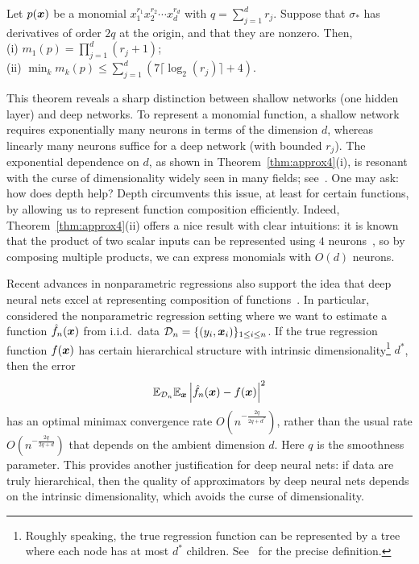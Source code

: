 \begin{thm}\label{thm:approx4}
Let $p(\text{\boldmath $x$})$ be a monomial $x_1^{r_1} x_2^{r_2} \cdots x_d^{r_d}$ with $q = \sum_{j=1}^d r_j$. Suppose that $\sigma_*$ has derivatives of order $2q$ at the origin, and that they are nonzero. Then,\\
(i) $m_1(p) = \prod_{j=1}^d (r_j + 1)$; \\
(ii) $\min_k m_k(p) \le \sum_{j=1}^d \left( 7 \lceil \log_2(r_j) \rceil + 4  \right)$.
\end{thm}

This theorem reveals a sharp distinction between shallow networks (one hidden layer) and deep networks. To represent a monomial function, a shallow network requires exponentially many neurons in terms of the dimension $d$, whereas linearly many neurons suffice for a deep network (with bounded $r_j$). The exponential dependence on $d$, as shown in Theorem~\ref{thm:approx4}(i), is resonant with the curse of dimensionality widely seen in many fields; see~\cite{donoho2000high}. One may ask: how does depth help? Depth circumvents this issue, at least for certain functions, by allowing us to represent function composition efficiently. Indeed, Theorem~\ref{thm:approx4}(ii) offers a nice result with clear intuitions: it is known that the product of two scalar inputs can be represented using $4$ neurons~\citep{lin2017does}, so by composing multiple products, we can express monomials with $O(d)$ neurons.

Recent advances in nonparametric regressions also support the idea that deep neural nets excel at representing composition of functions~\citep{bauer2017deep, schmidt2017nonparametric}. In particular,~\cite{bauer2017deep} considered the nonparametric regression setting where we want to estimate a function $\hat f_n(\text{\boldmath $x$})$ from i.i.d.~data $\mathcal{D}_n = \{ (y_i, \text{\boldmath $x$}_i) \}_{1\leq i\leq n}$. If the true regression function $f(\text{\boldmath $x$})$ has certain hierarchical structure with intrinsic dimensionality\footnote{Roughly speaking, the true regression function can be represented by a tree where each node has at most $d^*$ children. See~\cite{bauer2017deep} for the precise definition.} $d^*$, then the error
\begin{equation*}
\mathbb{E}_{\mathcal{D}_n} \mathbb{E}_{\text{\boldmath $x$}} \left| \hat f_n(\text{\boldmath $x$}) - f(\text{\boldmath $x$}) \right|^2
\end{equation*}
has an optimal minimax convergence rate $O(n^{-\frac{2q}{2q+d^*}})$, rather than the usual rate $O(n^{-\frac{2q}{2q+d}})$ that depends on the ambient dimension $d$. Here $q$ is the smoothness parameter. This provides another justification for deep neural nets: if data are truly hierarchical, then the quality of approximators by deep neural nets depends on the intrinsic dimensionality, which avoids the curse of dimensionality.
%

